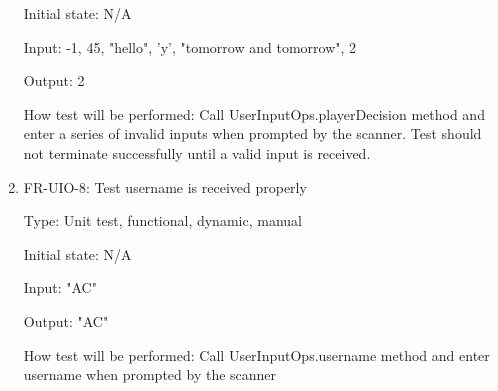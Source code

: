 \documentclass[12pt, titlepage]{article}
\begin{document}
\begin{enumerate}
    Initial state: N/A
    
    Input: -1, 45, "hello", 'y', "tomorrow and tomorrow", 2
    
    Output: 2
    
    How test will be performed: Call UserInputOps.playerDecision method and enter a series of invalid inputs when prompted by the scanner. Test should not terminate successfully until a valid input is received.
    
    \item{FR-UIO-8: Test username is received properly\\}
    
    Type: Unit test, functional, dynamic, manual
    
    Initial state: N/A
    
    Input: "AC"
    
    Output: "AC"
    
    How test will be performed: Call UserInputOps.username method and enter username when prompted by the scanner
\end{enumerate}
\end{document}
